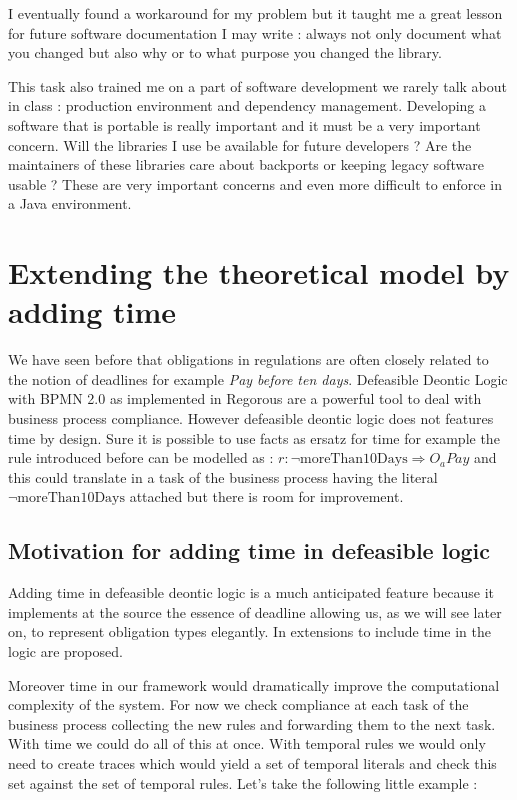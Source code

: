\documentclass[10pt]{report}
\begin{document}
I eventually found a workaround for my problem but it taught me a great lesson for future software documentation I may write : always not only document what you changed but also why or to what purpose you changed the library.

This task also trained me on a part of software development we rarely talk about in class : production environment and dependency management. Developing a software that is portable is really important and it must be a very important concern. Will the libraries I use be available for future developers ? Are the maintainers of these libraries care about backports or keeping legacy software usable ?
These are very important concerns and even more difficult to enforce in a Java environment. %


\section{Extending the theoretical model by adding time}

We have seen before that obligations in regulations are often closely related to the notion of deadlines for example \textit{Pay before ten days}. Defeasible Deontic Logic with BPMN 2.0 as implemented in Regorous are a powerful tool to deal with business process compliance. However defeasible deontic logic does not features time by design. Sure it is possible to use facts as ersatz for time for example the rule introduced before can be modelled as : $r: \neg \text{moreThan10Days} \Rightarrow O_{a}Pay$ and this could translate in a task of the business process having the literal $ \neg \text{moreThan10Days}$ attached but there is room for improvement.

\subsection{Motivation for adding time in defeasible logic}

Adding time in defeasible deontic logic is a much anticipated feature because it implements at the source the essence of deadline allowing us, as we will see later on, to represent obligation types elegantly. In \autocite{TemporalExtension2007} extensions to include time in the logic are proposed.

Moreover time in our framework would dramatically improve the computational complexity of the system. For now we check compliance at each task of the business process collecting the new rules and forwarding them to the next task. With time we could do all of this at once. With temporal rules we would only need to create traces which would yield a set of temporal literals and check this set against the set of temporal rules. Let's take the following little example : %
\end{document}
